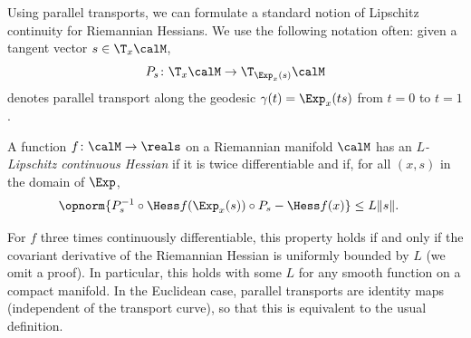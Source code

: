 Using parallel transports, we can formulate a standard notion of Lipschitz continuity for Riemannian Hessians.
We use the following notation often: given a tangent vector $s \in \T_x\calM$, 
\begin{align}
	P_s \colon \T_x\calM \to \T_{\Exp_x(s)}\calM
	\label{eq:Ps}
\end{align}
denotes parallel transport along the geodesic $\gamma(t) = \Exp_x(ts)$ from $t = 0$ to $t = 1$.
\begin{definition} \label{def:LipschitzHessRiemann}
	A function $f \colon \calM \to \reals$ on a Riemannian manifold $\calM$ has an \emph{$L$-Lipschitz continuous Hessian} if it is twice differentiable and if, for all $(x, s)$ in the domain of $\Exp$,
	\begin{align*}
		\opnorm{ P_s^{-1} \circ \Hess f(\Exp_x(s)) \circ P_s - \Hess f(x)} & \leq L \|s\|. %
	\end{align*}
\end{definition}
For $f$ three times continuously differentiable, this property holds if and only if the covariant derivative of the Riemannian Hessian is uniformly bounded by $L$ (we omit a proof). In particular, this holds with some $L$ for any smooth function on a compact manifold.
In the Euclidean case, parallel transports are identity maps (independent of the transport curve), so that this is equivalent to the usual definition.

